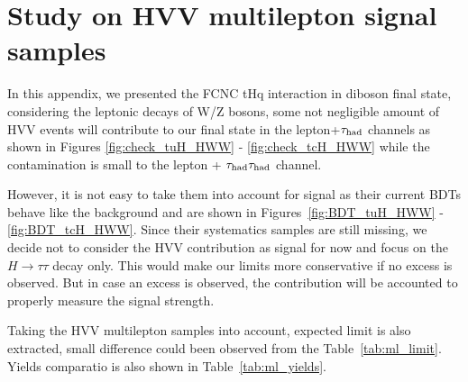 \section{Study on HVV multilepton signal samples}
\label{sec:HVVML}

In this appendix, we presented the FCNC tHq interaction in diboson final state, considering the leptonic decays of W/Z bosons, some not negligible amount of HVV events will contribute to our final state in the lepton+$\tau_\text{had}$ channels as shown in Figures \ref{fig:check_tuH_HWW} - \ref{fig:check_tcH_HWW} while the contamination is small to the lepton + $\tau_\text{had}{}\tau_\text{had}$ channel.

However, it is not easy to take them into account for signal as their current BDTs behave like the background and are shown in Figures~\ref{fig:BDT_tuH_HWW} - \ref{fig:BDT_tcH_HWW}.  
Since their systematics samples are still missing, we decide not to consider the HVV contribution as signal for now and focus on the $H\rightarrow \tau\tau$ decay only.
This would make our limits more conservative if no excess is observed. But in case an excess is observed, the contribution will be accounted to properly measure the signal strength.

Taking the HVV multilepton samples into account, expected limit is also extracted, small difference could been observed from the Table~\ref{tab:ml_limit}. Yields comparatio is also shown in Table~\ref{tab:ml_yields}. 



